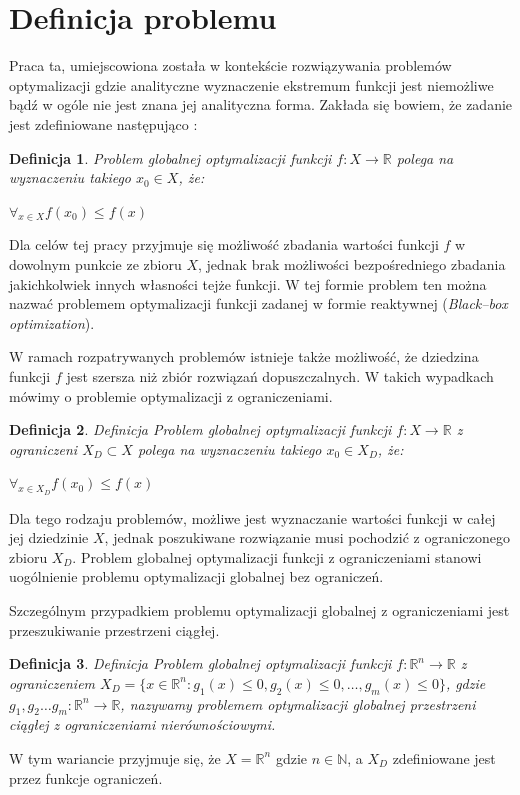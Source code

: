 \documentclass[12pt,a4paper]{report}
\begin{document}
\section{Definicja problemu}
\label{ProblemDefinition}
\par{
Praca ta, umiejscowiona została w kontekście rozwiązywania problemów optymalizacji gdzie analityczne wyznaczenie ekstremum funkcji jest niemożliwe bądź w ogóle nie jest znana jej analityczna forma. Zakłada się bowiem, że zadanie jest zdefiniowane następująco \cite{StrojnowskiOptymalizacja2}:
}
\newtheorem{OptDefinition}{Definicja}
\par{
\begin{OptDefinition}
Problem globalnej optymalizacji funkcji $f: X \rightarrow \mathbb{R}$ polega na wyznaczeniu takiego $x_0 \in X$, że:
\begin{center}
	$\forall_{x \in X} f(x_0) \leq f(x)$
\end{center}
\end{OptDefinition}
\par{
Dla celów tej pracy przyjmuje się możliwość zbadania wartości funkcji $f$ w dowolnym punkcie ze zbioru $X$, jednak brak możliwości bezpośredniego zbadania jakichkolwiek innych własności tejże funkcji. W tej formie problem ten można nazwać problemem optymalizacji funkcji zadanej w formie reaktywnej (\emph{Black--box optimization}).
}
\par{
W ramach rozpatrywanych problemów istnieje także możliwość, że dziedzina funkcji $f$ jest szersza niż zbiór rozwiązań dopuszczalnych. W takich wypadkach mówimy o problemie optymalizacji z ograniczeniami.
\begin{OptDefinition}{Definicja}
Problem globalnej optymalizacji funkcji $f: X \rightarrow \mathbb{R}$ z ograniczeni $X_D \subset X$ polega na wyznaczeniu takiego $x_0 \in X_D$, że:
\begin{center}
	$\forall_{x \in X_D} f(x_0) \leq f(x)$
\end{center}
\end{OptDefinition}
Dla tego rodzaju problemów, możliwe jest wyznaczanie wartości funkcji w całej jej dziedzinie $X$, jednak poszukiwane rozwiązanie musi pochodzić z ograniczonego zbioru $X_D$.
Problem globalnej optymalizacji funkcji z ograniczeniami stanowi uogólnienie problemu optymalizacji globalnej bez ograniczeń.
}
\par{
Szczególnym przypadkiem problemu optymalizacji globalnej z ograniczeniami jest przeszukiwanie przestrzeni ciągłej. 
\begin{OptDefinition}{Definicja}
Problem globalnej optymalizacji funkcji $f: \mathbb{R}^n \rightarrow \mathbb{R}$ z ograniczeniem $X_D = \{x \in \mathbb{R}^n: g_1(x) \leq 0, g_2(x) \leq 0, \ldots, g_m(x) \leq 0\}$, gdzie $g_1, g_2 \ldots g_m: \mathbb{R}^n \rightarrow \mathbb{R}$, nazywamy problemem optymalizacji globalnej przestrzeni ciągłej z ograniczeniami nierównościowymi.
\end{OptDefinition}
W tym wariancie przyjmuje się, że $X = \mathbb{R}^n$ gdzie $n \in \mathbb{N}$, a $X_D$ zdefiniowane jest przez funkcje ograniczeń.
}

}
\end{document}
